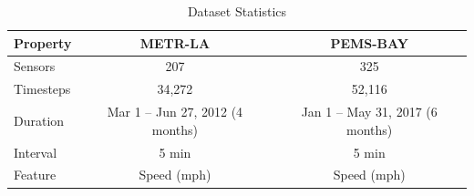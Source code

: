 \begin{table}[ht]
\centering
\caption{Dataset Statistics}
\label{tab:dataset_stats}
\begin{tabular}{lcc}
\toprule
Property & METR-LA & PEMS-BAY \\
\midrule
Sensors & 207 & 325 \\
Timesteps & 34,272 & 52,116 \\
Duration & Mar 1 – Jun 27, 2012 (4 months) & Jan 1 – May 31, 2017 (6 months) \\
Interval & 5 min & 5 min \\
Feature & Speed (mph) & Speed (mph) \\
\bottomrule
\end{tabular}
\end{table}